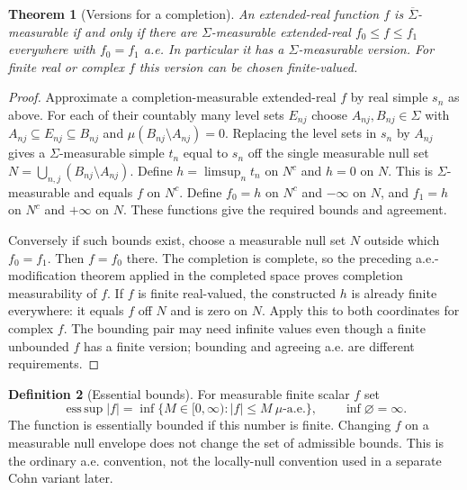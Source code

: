\documentclass[11pt,oneside,openany]{book}
\newtheorem{theorem}{Theorem}[chapter]
\theoremstyle{definition}
\newtheorem{definition}[theorem]{Definition}
\theoremstyle{remark}
\DeclareMathOperator{\esssup}{ess\,sup}\DeclareMathOperator{\Var}{Var}
\newcommand{\family}[1]{}
\begin{document}
\begin{theorem}[Versions for a completion]
\family{D11.04.completion_representative}\label{d11:04:completion-representative}
An extended-real function $f$ is $\overline\Sigma$-measurable if and only if
there are $\Sigma$-measurable extended-real $f_0\leq f\leq f_1$ everywhere
with $f_0=f_1$ a.e. In particular it has a $\Sigma$-measurable version.
For finite real or complex $f$ this version can be chosen finite-valued.
\end{theorem}
\begin{proof}
Approximate a completion-measurable extended-real $f$ by real simple $s_n$
as above. For each of their countably many level sets $E_{nj}$ choose
$A_{nj},B_{nj}\in\Sigma$ with
$A_{nj}\subseteq E_{nj}\subseteq B_{nj}$ and
$\mu(B_{nj}\setminus A_{nj})=0$. Replacing the level sets in $s_n$ by
$A_{nj}$ gives a $\Sigma$-measurable simple $t_n$ equal to $s_n$ off the
single measurable null set $N=\bigcup_{n,j}(B_{nj}\setminus A_{nj})$.
Define $h=\limsup_n t_n$ on $N^c$ and $h=0$ on $N$. This is
$\Sigma$-measurable and equals $f$ on $N^c$. Define $f_0=h$ on $N^c$
and $-\infty$ on $N$, and $f_1=h$ on $N^c$ and $+\infty$ on $N$.
These functions give the required bounds and agreement.

Conversely if such bounds exist, choose a measurable null set $N$ outside
which $f_0=f_1$. Then $f=f_0$ there. The completion is complete, so the
preceding a.e.-modification theorem applied in the completed space proves
completion measurability of $f$.
If $f$ is finite real-valued, the constructed $h$ is already finite everywhere:
it equals $f$ off $N$ and is zero on $N$. Apply this to both coordinates
for complex $f$. The bounding pair may need infinite values even though a
finite unbounded $f$ has a finite version; bounding and agreeing a.e. are
different requirements.
\end{proof}

\begin{definition}[Essential bounds]
\family{D11.04.essential_bounds}\label{d11:04:essential-bounds}
For measurable finite scalar $f$ set
\[
 \esssup|f|=\inf\{M\in[0,\infty): |f|\leq M\ \mu\text{-a.e.}\},
 \qquad \inf\varnothing=\infty.
\]
The function is essentially bounded if this number is finite. Changing $f$
on a measurable null envelope does not change the set of admissible bounds.
This is the ordinary a.e. convention, not the locally-null convention used
in a separate Cohn variant later.
\end{definition}
\end{document}
